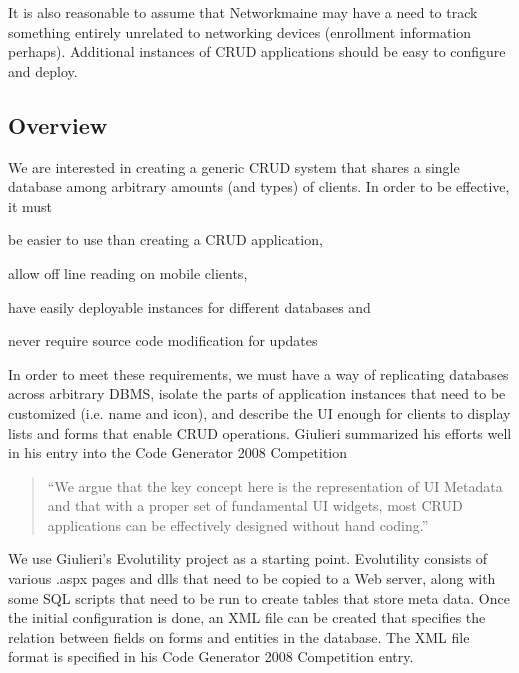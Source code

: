 It is also reasonable to assume that Networkmaine may have a need to track
something entirely unrelated to networking devices (enrollment information
perhaps). Additional instances of CRUD applications should be easy to configure
and deploy.


\subsection{Overview}  \label{sec:overview}







We are interested in creating a generic CRUD system that shares a single database among arbitrary amounts (and types) of clients. In order to be effective, it must 
\begin{inparaenum}
\item be easier to use than creating a CRUD application,
\item allow off line reading on mobile clients,
\item have easily deployable instances for different databases and
\item never require source code modification for updates
\end{inparaenum}
In order to meet these requirements, we must have a way of replicating databases across arbitrary DBMS, isolate the parts of application instances that need to be customized (i.e. name and icon), and describe the UI enough for clients to display lists and forms that enable CRUD operations. Giulieri summarized his efforts well in his entry into the Code Generator 2008 Competition\cite{giulieri_minimalist_2011}
\begin{quotation}
``We argue that the key concept here is the representation of UI Metadata and that with a proper set of fundamental UI widgets, most CRUD applications can be effectively designed without hand coding.''
\end{quotation}
We use Giulieri's Evolutility\cite{giulieri_evolutility_????} project as a starting point. Evolutility consists of various .aspx pages and dlls that need to be copied to a Web server, along with some SQL scripts that need to be run to create tables that store meta data. Once the initial configuration is done, an XML file can be created that specifies the relation between fields on forms and entities in the database. The XML file format is specified in his Code Generator 2008 Competition entry\cite{giulieri_minimalist_2011}. 

